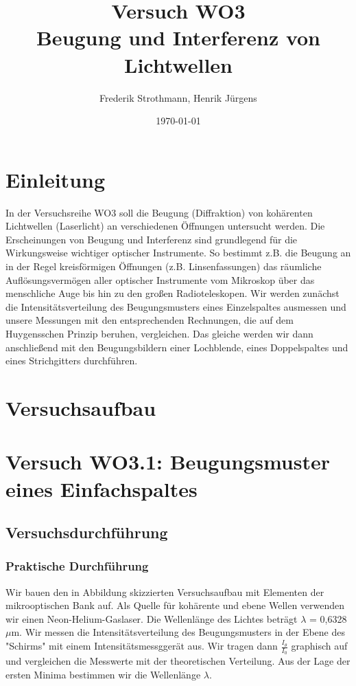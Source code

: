 \documentclass[12pt]{scrartcl}
\title{Versuch WO3\\ Beugung und Interferenz von Lichtwellen}
\author{Frederik Strothmann, Henrik Jürgens}
\date{\today}
\begin{document}

\maketitle
\newpage
\tableofcontents
\newpage


\section{Einleitung}

In der Versuchsreihe WO3 soll die Beugung (Diffraktion) von kohärenten Lichtwellen (Laserlicht) an verschiedenen Öffnungen untersucht werden.
Die Erscheinungen von Beugung und Interferenz sind grundlegend für die Wirkungsweise wichtiger optischer Instrumente. So bestimmt z.B. die Beugung an in der Regel kreisförmigen Öffnungen (z.B. Linsenfassungen) das räumliche Auflösungsvermögen aller optischer Instrumente vom Mikroskop über das menschliche Auge bis hin zu den großen Radioteleskopen. Wir werden zunächst die Intensitätsverteilung des Beugungsmusters eines Einzelspaltes ausmessen und unsere Messungen mit den entsprechenden Rechnungen, die auf dem Huygensschen Prinzip beruhen, vergleichen. Das gleiche werden wir dann anschließend mit den Beugungsbildern einer Lochblende, eines Doppelspaltes und eines Strichgitters durchführen.

\section{Versuchsaufbau}

\section{Versuch WO3.1: Beugungsmuster eines Einfachspaltes}
\subsection{Versuchsdurchführung}

\subsubsection{Praktische Durchführung}
Wir bauen den in Abbildung 
skizzierten Versuchsaufbau mit Elementen der mikrooptischen Bank auf. Als Quelle für kohärente und ebene Wellen verwenden wir einen Neon-Helium-Gaslaser. Die Wellenlänge des Lichtes beträgt $\lambda$ = 0,6328 $\mu$m.
Wir messen die Intensitätsverteilung des Beugungsmusters in der Ebene des "Schirms" mit einem Intensitätsmessggerät aus. Wir tragen dann $\frac{I_\theta}{I_0}$ graphisch auf und vergleichen die Messwerte mit der theoretischen Verteilung. Aus der Lage der ersten Minima bestimmen wir die Wellenlänge $\lambda$.
\end{document}

